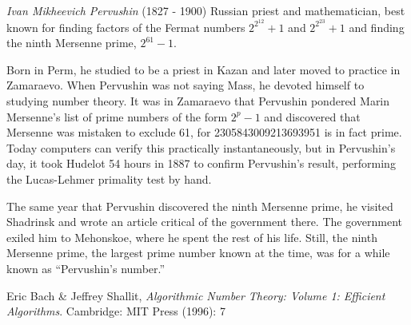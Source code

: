\documentclass[12pt]{article}
\begin{document}
\emph{Ivan Mikheevich Pervushin} (1827 - 1900) Russian priest and mathematician, best known for finding factors of the Fermat numbers $2^{2^{12}} + 1$ and $2^{2^{23}} + 1$ and finding the ninth Mersenne prime, $2^{61} - 1$.

Born in Perm, he studied to be a priest in Kazan and later moved to practice in Zamaraevo. When Pervushin was not saying Mass, he devoted himself to studying number theory. It was in Zamaraevo that Pervushin pondered Marin Mersenne's list of prime numbers of the form $2^p - 1$ and discovered that Mersenne was mistaken to exclude 61, for 2305843009213693951 is in fact prime. Today computers can verify this practically instantaneously, but in Pervushin's day, it took Hudelot 54 hours in 1887 to confirm Pervushin's result, performing the Lucas-Lehmer primality test by hand.

The same year that Pervushin discovered the ninth Mersenne prime, he visited Shadrinsk and wrote an article critical of the government there. The government exiled him to Mehonskoe, where he spent the rest of his life. Still, the ninth Mersenne prime, the largest prime number known at the time, was for a while known as ``Pervushin's number.''

\begin{thebibliography}{1}
 Eric Bach \& Jeffrey Shallit, {\it Algorithmic Number Theory: Volume 1: Efficient Algorithms}. Cambridge: MIT Press (1996): 7
\end{thebibliography}
\end{document}

